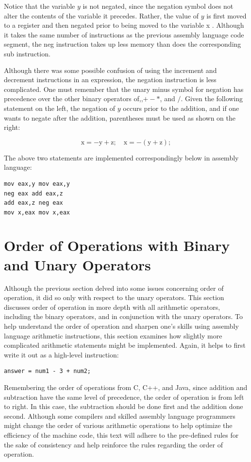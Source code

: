 \documentclass[10pt]{book}
\begin{document}
Notice that the variable $y$ is not negated, since the negation symbol does not alter the contents of the variable it precedes. Rather, the value of $y$ is first moved to a register and then negated prior to being moved to the variable x . Although it takes the same number of instructions as the previous assembly language code segment, the neg instruction takes up less memory than does the corresponding sub instruction.

Although there was some possible confusion of using the increment and decrement instructions in an expression, the negation instruction is less complicated. One must remember that the unary minus symbol for negation has precedence over the other binary operators of,,$+- *$, and $/$. Given the following statement on the left, the negation of $y$ occurs prior to the addition, and if one wants to negate after the addition, parentheses must be used as shown on the right:

$$
\mathrm{x}=-\mathrm{y}+\mathrm{z} ; \quad \mathrm{x}=-(\mathrm{y}+\mathrm{z}) ;
$$

The above two statements are implemented correspondingly below in assembly language:

\begin{verbatim}
mov eax,y mov eax,y
neg eax add eax,z
add eax,z neg eax
mov x,eax mov x,eax
\end{verbatim}

\section{Order of Operations with Binary and Unary Operators}
Although the previous section delved into some issues concerning order of operation, it did so only with respect to the unary operators. This section discusses order of operation in more depth with all arithmetic operators, including the binary operators, and in conjunction with the unary operators. To help understand the order of operation and sharpen one's skills using assembly language arithmetic instructions, this section examines how slightly more complicated arithmetic statements might be implemented. Again, it helps to first write it out as a high-level instruction:

\begin{verbatim}
answer = num1 - 3 + num2;
\end{verbatim}

Remembering the order of operations from C, C++, and Java, since addition and subtraction have the same level of precedence, the order of operation is from left to right. In this case, the subtraction should be done first and the addition done second. Although some compilers and skilled assembly language programmers might change the order of various arithmetic operations to help optimize the efficiency of the machine code, this text will adhere to the pre-defined rules for the sake of consistency and help reinforce the rules regarding the order of operation.
\end{document}
